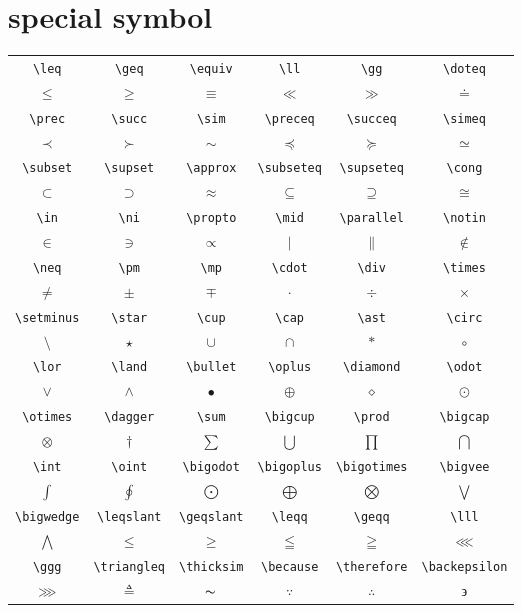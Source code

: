 \documentclass[11pt,a4paper]{article}
\begin{document}
\section{special symbol}
\begin{table}[htp]
\centering
\begin{tabular}{cccccc}
	\verb|\leq| & \verb|\geq| & \verb|\equiv| & \verb|\ll| & \verb|\gg| & \verb|\doteq| \\
	$\leq$ & $\geq$ & $\equiv$ & $\ll$ & $\gg$ & $\doteq$ \\
	\hline
	\verb|\prec| & \verb|\succ| & \verb|\sim| & \verb|\preceq| & \verb|\succeq| & \verb|\simeq| \\
	$\prec$ & $\succ$ & $\sim$ & $\preceq$ & $\succeq$ & $\simeq$ \\
	\hline
	\verb|\subset| & \verb|\supset| & \verb|\approx| & \verb|\subseteq| & \verb|\supseteq| & \verb|\cong| \\
	$\subset$ & $\supset$ & $\approx$ & $\subseteq$ & $\supseteq$ & $\cong$ \\
	\hline
	\verb|\in| & \verb|\ni| & \verb|\propto| & \verb|\mid| & \verb|\parallel| & \verb|\notin| \\
	$\in$ & $\ni$ & $\propto$ & $\mid$ & $\parallel$ & $\notin$ \\
	\hline
	\verb|\neq| & \verb|\pm| & \verb|\mp| & \verb|\cdot| & \verb|\div| & \verb|\times| \\
	$\neq$ & $\pm$ & $\mp$ & $\cdot$ & $\div$ & $\times$  \\
	\hline
	\verb|\setminus| & \verb|\star| & \verb|\cup| & \verb|\cap| & \verb|\ast| & \verb|\circ|\\
	$\setminus$ & $\star$ & $\cup$ & $\cap$ & $\ast$ & $\circ$ \\
	\hline
	\verb|\lor| & \verb|\land| & \verb|\bullet| & \verb|\oplus| & \verb|\diamond| & \verb|\odot| \\
	$\lor$ & $\land$ & $\bullet$ & $\oplus$ & $\diamond$ & $\odot$ \\
	\hline
	\verb|\otimes| & \verb|\dagger| & \verb|\sum| & \verb|\bigcup| & \verb|\prod| & \verb|\bigcap| \\
	$\otimes$ & $\dagger$ & $\sum$ & $\bigcup$ & $\prod$ & $\bigcap$ \\
	\hline
	\verb|\int| & \verb|\oint| & \verb|\bigodot| & \verb|\bigoplus| & \verb|\bigotimes| & \verb|\bigvee| \\
	$\int$ & $\oint$ & $\bigodot$ & $\bigoplus$ & $\bigotimes$ & $\bigvee$ \\
	\hline
	\verb|\bigwedge| & \verb|\leqslant| & \verb|\geqslant| & \verb|\leqq| & \verb|\geqq| & \verb|\lll| \\
	$\bigwedge$ & $\leqslant$ & $\geqslant$ & $\leqq$ & $\geqq$ & $\lll$ \\
	\hline
	\verb|\ggg| & \verb|\triangleq| & \verb|\thicksim| & \verb|\because| & \verb|\therefore| & \verb|\backepsilon| \\
	$\ggg$ & $\triangleq$ & $\thicksim$ & $\because$ & $\therefore$ & $\backepsilon$ \\
	\hline
\end{tabular}
\end{table}
\end{document}
